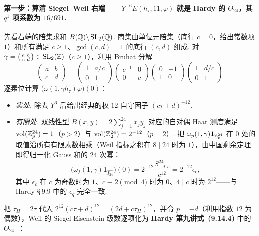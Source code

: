 \paragraph{第一步：算清 Siegel--Weil 右端——$Y^{-6}E(h_\tau,11,\varphi)$ 就是 Hardy 的 $\Theta_{24}$，其 $q^1$ 项系数为 $16/691$.}
先看右端的陪集求和 $B(\mathbb{Q})\backslash\operatorname{SL}_2(\mathbb{Q})$. 商集由单位元陪集（底行 $c=0$，给出常数项 $1$）和所有满足 $c\ge 1$、$\gcd(c,d)=1$ 的底行 $(c,d)$ 组成. 对 $\gamma=\bigl(\begin{smallmatrix}a&b\\c&d\end{smallmatrix}\bigr)\in\operatorname{SL}_2(\mathbb{Z})$（$c\ge 1$），利用 Bruhat 分解
\[
\begin{pmatrix}a&b\\c&d\end{pmatrix}
=\begin{pmatrix}1&a/c\\0&1\end{pmatrix}
 \begin{pmatrix}c^{-1}&0\\0&c\end{pmatrix}
 \begin{pmatrix}0&-1\\1&0\end{pmatrix}
 \begin{pmatrix}1&d/c\\0&1\end{pmatrix}
\]
逐素位计算 $\bigl(\omega(1,\gamma h_\tau)\varphi\bigr)(0)$：
\begin{itemize}
\item \emph{实处.} 除去 $Y^6$ 后给出经典的权 $12$ 自守因子 $(c\tau+d)^{-12}$.
\item \emph{有限处.} 双线性型 $B(x,y)=2\sum_{j=1}^{24}x_j y_j$ 对应的自对偶 Haar 测度满足 $\operatorname{vol}(\mathbb{Z}_p^{24})=1$（$p>2$）与 $\operatorname{vol}(\mathbb{Z}_2^{24})=2^{-12}$（$p=2$）. 把 $\omega_p(1,\gamma)\mathbf 1_{\mathbb{Z}_p^{24}}$ 在 $0$ 处的取值沿所有有限素数相乘（Weil 指标之积在 $8\mid 24$ 时为 $1$），由中国剩余定理即得归一化 Gauss 和的 $24$ 次幂：
\[
\bigl(\omega_f(1,\gamma)\mathbf 1_{\widehat{I_{24}}}\bigr)(0)
=2^{-12}\frac{S_{-d,c}^{24}}{c^{12}}
=2^{-12}\epsilon_c,
\]
其中 $\epsilon_c$ 在 $c$ 为奇数时为 $1$、$c\equiv 2\pmod 4$ 时为 $0$、$4\mid c$ 时为 $2^{12}$——与 Hardy \S\,9.9 中的 $\epsilon_q$ 完全一致.
\end{itemize}
把 $\tau_H=2\tau$ 代入 $2^{12}(c\tau+d)^{12}=(2d+c\tau_H)^{12}$，并令 $p=-d$（利用指数 $12$ 为偶数），Weil 的 Siegel Eisenstein 级数逐项化为 \textbf{Hardy 第九讲式~(9.14.4)} 中的 $\Theta_{24}$~\cite[第~150~页]{Hardy1940}：
